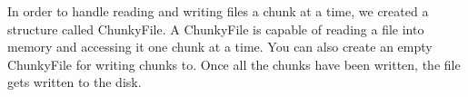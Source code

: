 	
		In order to handle reading and writing files a chunk at a time, we created a structure called ChunkyFile. A ChunkyFile is capable of reading a file into memory and accessing it one chunk at a time. You can also create an empty ChunkyFile for writing chunks to. Once all the chunks have been written, the file gets written to the disk.
	
	
	
	
	
	
	
	
	
	
	
	
	
	